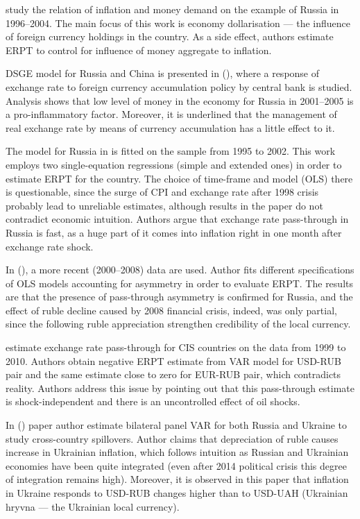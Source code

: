 \documentclass[12pt, a4paper]{extarticle}
\begin{document}
\textcite{Oomes2005} study the relation of inflation and money demand on the example of Russia in 1996--2004. The main focus of this work is economy dollarisation --- the influence of foreign currency holdings in the country. As a side effect, authors estimate ERPT to control for influence of money aggregate to inflation. 

DSGE model for Russia and China is presented in (\cite{Sosunov2006}), where a response of exchange rate to foreign currency accumulation policy by central bank is studied. Analysis shows that low level of money in the economy for Russia in 2001--2005 is a pro-inflammatory factor. Moreover, it is underlined that the management of real exchange rate by means of currency accumulation has a little effect to it.

The model for Russia in \cite{Dobrynskaya2008} is fitted on the sample from 1995 to 2002. This work employs two single-equation regressions (simple and extended ones) in order to estimate ERPT for the country. The choice of time-frame and model (OLS) there is questionable, since the surge of CPI and exchange rate after 1998 crisis probably lead to unreliable estimates, although results in the paper do not contradict economic intuition. Authors argue that exchange rate pass-through in Russia is fast, as a huge part of it comes into inflation right in one month after exchange rate shock.

In (\cite{Kataranova2010}), a more recent (2000--2008) data are used. Author fits different specifications of OLS models accounting for asymmetry in order to evaluate ERPT. The results are that the presence of pass-through asymmetry is confirmed for Russia, and the effect of ruble decline caused by 2008 financial crisis, indeed, was only partial, since the following ruble appreciation strengthen credibility of the local currency.

\textcite{Beckmann2013} estimate exchange rate pass-through for CIS countries on the data from 1999 to 2010. Authors obtain negative ERPT estimate from VAR model for USD-RUB pair and the same estimate close to zero for EUR-RUB pair, which contradicts reality. Authors address this issue by pointing out that this pass-through estimate is shock-independent and there is an uncontrolled effect of oil shocks.

In (\cite{Faryna2016}) paper author estimate bilateral panel VAR for both Russia and Ukraine to study cross-country spillovers. Author claims that depreciation of ruble causes increase in Ukrainian inflation, which follows intuition as Russian and Ukrainian economies have been quite integrated (even after 2014 political crisis this degree of integration remains high). Moreover, it is observed in this paper that inflation in Ukraine responds to USD-RUB changes higher than to USD-UAH (Ukrainian hryvna --- the Ukrainian local currency). 
\end{document}
